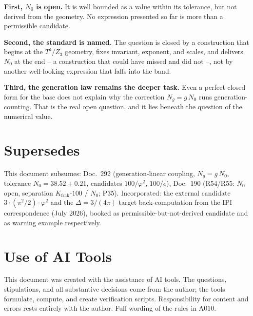 \textbf{First, $N_0$ is open.} It is well bounded as a value within its tolerance,
but not derived from the geometry. No expression presented so far is more than a
permissible candidate.

\textbf{Second, the standard is named.} The question is closed by a construction
that begins at the $T^4/Z_3$ geometry, fixes invariant, exponent, and scales, and
delivers $N_0$ at the end -- a construction that could have missed and did not --,
not by another well-looking expression that falls into the band.

\textbf{Third, the generation law remains the deeper task.} Even a perfect closed
form for the base does not explain why the correction $N_g = g\,N_0$ runs
generation-counting. That is the real open question, and it lies beneath the
question of the numerical value.

\section{Supersedes}

This document subsumes: Doc.~292 (generation-linear coupling, $N_g=g\,N_0$,
tolerance $N_0=38{.}52\pm0{.}21$, candidates $100/\varphi^2$, $100/e$), Doc.~190
(R54/R55: $N_0$ open, separation $K_\text{frak}$-$100$ / $N_0$; P35). Incorporated:
the external candidate $3\cdot(\pi^2/2)\cdot\varphi^2$ and the $\Delta=3/(4\pi)$
target back-computation from the IPI correspondence (July 2026), booked as
permissible-but-not-derived candidate and as warning example respectively.

\section{Use of AI Tools}

This document was created with the assistance of AI tools. The questions,
stipulations, and all substantive decisions come from the author; the tools
formulate, compute, and create verification scripts.
Responsibility for content and errors rests entirely with the author.
Full wording of the rules in A010.
